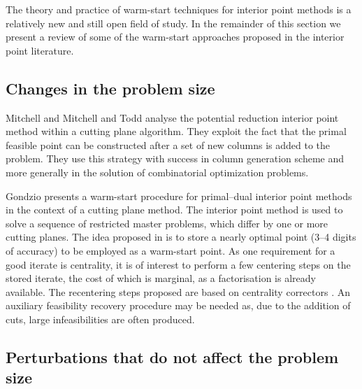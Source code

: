 {The theory and practice of warm-start techniques for interior point 
methods is a relatively new and still open field of study.
In the remainder of this section we present a review of some 
of the warm-start approaches proposed in the interior point literature.

%
%
\subsection{Changes in the problem size}

Mitchell \cite{Mitchell88} and Mitchell and Todd \cite{MitchellTodd}
analyse the potential reduction interior point method within
a cutting plane algorithm. They exploit the fact that
the primal feasible point can be constructed after a set of new
columns is added to the problem. They use this strategy with success
in column generation scheme and more generally in the solution 
of combinatorial optimization problems.

Gondzio \cite{Gondzio98} presents a warm-start procedure for 
primal--dual interior point methods in the context of a cutting 
plane method. The interior 
point method is used to solve a sequence of restricted master 
problems, which differ by one or more cutting planes.
%
%
The idea proposed in \cite{Gondzio98} is to store a nearly optimal 
point (3--4 digits of accuracy) to be employed as a warm-start point.
%
%
As one requirement for a good iterate is centrality, it is of interest 
to perform a few centering steps on the stored iterate, the cost of 
which is marginal, as a factorisation is already available. The 
recentering steps proposed are based on
centrality correctors \cite{Gondzio96}.
An auxiliary feasibility recovery procedure may be needed as, due to 
the addition of cuts, large infeasibilities are often produced.


%
%
\subsection{Perturbations that do not affect the problem size}

}

